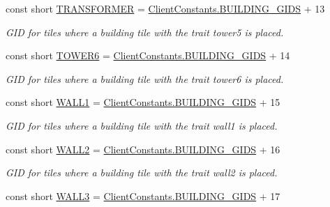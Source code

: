 \begin{DoxyCompactItemize}
const short \hyperlink{classClient_1_1Common_1_1Constants_1_1BuildingGid_a92b294404ddf43444c7371a39983d120}{T\+R\+A\+N\+S\+F\+O\+R\+M\+E\+R} = \hyperlink{classClient_1_1Common_1_1Constants_1_1ClientConstants_ad2e944ac733f952d3d0c2e24fe5d14ad}{Client\+Constants.\+B\+U\+I\+L\+D\+I\+N\+G\+\_\+\+G\+I\+D\+S} + 13
\begin{DoxyCompactList}\small\item\em G\+I\+D for tiles where a building tile with the trait tower5 is placed. \end{DoxyCompactList}\item 
const short \hyperlink{classClient_1_1Common_1_1Constants_1_1BuildingGid_ae8f7164d2a014c73d3a7e4a0bd63d85c}{T\+O\+W\+E\+R6} = \hyperlink{classClient_1_1Common_1_1Constants_1_1ClientConstants_ad2e944ac733f952d3d0c2e24fe5d14ad}{Client\+Constants.\+B\+U\+I\+L\+D\+I\+N\+G\+\_\+\+G\+I\+D\+S} + 14
\begin{DoxyCompactList}\small\item\em G\+I\+D for tiles where a building tile with the trait tower6 is placed. \end{DoxyCompactList}\item 
const short \hyperlink{classClient_1_1Common_1_1Constants_1_1BuildingGid_ab28e3c37a26afe3ce15089598a679735}{W\+A\+L\+L1} = \hyperlink{classClient_1_1Common_1_1Constants_1_1ClientConstants_ad2e944ac733f952d3d0c2e24fe5d14ad}{Client\+Constants.\+B\+U\+I\+L\+D\+I\+N\+G\+\_\+\+G\+I\+D\+S} + 15
\begin{DoxyCompactList}\small\item\em G\+I\+D for tiles where a building tile with the trait wall1 is placed. \end{DoxyCompactList}\item 
const short \hyperlink{classClient_1_1Common_1_1Constants_1_1BuildingGid_aa10dd7a207483d0b637866d7efdaca88}{W\+A\+L\+L2} = \hyperlink{classClient_1_1Common_1_1Constants_1_1ClientConstants_ad2e944ac733f952d3d0c2e24fe5d14ad}{Client\+Constants.\+B\+U\+I\+L\+D\+I\+N\+G\+\_\+\+G\+I\+D\+S} + 16
\begin{DoxyCompactList}\small\item\em G\+I\+D for tiles where a building tile with the trait wall2 is placed. \end{DoxyCompactList}\item 
const short \hyperlink{classClient_1_1Common_1_1Constants_1_1BuildingGid_a696238b51048c5870743cbe50fb58106}{W\+A\+L\+L3} = \hyperlink{classClient_1_1Common_1_1Constants_1_1ClientConstants_ad2e944ac733f952d3d0c2e24fe5d14ad}{Client\+Constants.\+B\+U\+I\+L\+D\+I\+N\+G\+\_\+\+G\+I\+D\+S} + 17

\end{DoxyCompactItemize}
